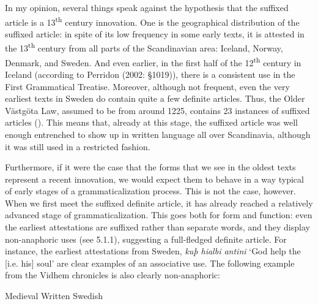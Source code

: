 \begin{styleBodytextC}
In my opinion, several things speak against the hypothesis that the suffixed article is a 13\textsuperscript{th} century innovation. One is the geographical distribution of the suffixed article: in spite of its low frequency in some early texts, it is attested in the 13\textsuperscript{th} century from all parts of the Scandinavian area: Iceland, Norway, Denmark, and Sweden.  And even earlier, in the first half of the 12\textsuperscript{th} century in Iceland (according to Perridon (2002: §1019)), there is a consistent use in the First Grammatical Treatise. Moreover, although not frequent, even the very earliest texts in Sweden do contain quite a few definite articles. Thus, the Older Västgöta Law, assumed to be from around 1225, contains 23 instances of suffixed articles (\citet[24]{Larm1936}). This means that, already at this stage, the suffixed article was well enough entrenched to show up in written language all over Scandinavia, although it was still used in a restricted fashion. 

\end{styleBodytextC}

\begin{styleBodytextC}
Furthermore, if it were the case that the forms that we see in the oldest texts represent a recent innovation, we would expect them to behave in a way typical of early stages of a grammaticalization process. This is not the case, however. When we first meet the suffixed definite article, it has already reached a relatively advanced stage of grammaticalization. This goes both for form and function: even the earliest attestations are suffixed rather than separate words, and they display non-anaphoric uses (see 5.1.1), suggesting a full-fledged definite article. For instance, the earliest attestations from Sweden, \textit{kuþ hialbi antini }‘God help the [i.e. his] soul’ are clear examples of an associative use. The following example from the Vidhem chronicles is also clearly non-anaphoric:

\end{styleBodytextC}

\begin{listWWNumileveli}
\item 

\begin{styleExample}
Medieval Written Swedish 

\end{styleExample}

\end{listWWNumileveli}

